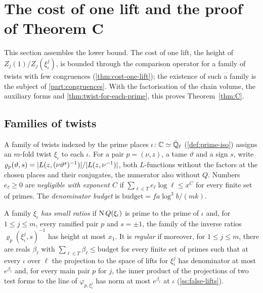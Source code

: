 \section{The cost of one lift and the proof of Theorem C}\label{sec:theorem-C}

This section assembles the lower bound. The cost of one lift, the height of $Z_j(1)/Z_j(\xi^j_\iota)$, is bounded through the comparison operator for a family of twists
with few congruences (\cref{thm:cost-one-lift}); the existence of such a family is the subject of \cref{part:congruences}. With the factorisation of the chain volume, the
auxiliary forms and \cref{thm:twist-for-each-prime}, this proves Theorem~\ref{thm:C}.

\subsection{Families of twists}\label{ss:twist-families}
A family of twists indexed by the prime places $\iota\colon\mathbb{C}\simeq\bar{\mathbb{Q}}_\ell$ (\cref{def:prime-iso}) assigns an $m$-fold twist $\xi_\iota$ to each $\iota$. For a pair $p=(\nu,z)$, a tame $\vartheta$ and a sign $s$, write
$\varrho_p(\vartheta,s)=\lvert L(z,(\nu\vartheta^s)^{-1})\rvert/\lvert L(z,\nu^{-1})\rvert$, both $L$-functions without the factors at the chosen places and their conjugates, the numerator also without $Q$. Numbers $e_\ell\ge0$ are \emph{negligible with
exponent $C$} if $\sum_{\ell\in T}e_\ell\log\ell\le x^C$ for every finite set of primes. The \emph{denominator budget} is $\mathrm{budget}=fa\log^3b/(mk)$.

\begin{definition}\label{def:small-ratios}\label{def:regular-family}
A family $\xi_\iota$ \emph{has small ratios} if $\operatorname{N} Q(\xi_\iota)$ is prime to the prime of $\iota$ and, for $1\le j\le m$, every ramified pair $p$ and $s=\pm1$, the family of the inverse ratios $\varrho_p(\xi^j_\iota,s)^{-1}$ has height at
most $x_1$. It is \emph{regular} if moreover, for $1\le j\le m$, there are reals $\beta_\ell$ with $\sum_{\ell\in T}\beta_\ell\le\mathrm{budget}$ for every finite set of primes such that at every $\iota$ over $\ell$ the projection to the space of
lifts for $\xi^j_\iota$ has denominator at most $e^{\beta_\ell}$ and, for every main pair $p$ for $j$, the inner product of the projections of two test forms to the line of $\varphi_{p,\xi^j_\iota}$ has norm at most $e^{\beta_\ell}$ at $\iota$
(\cref{ss:false-lifts}).
\end{definition}

